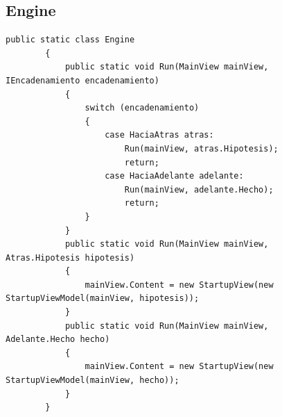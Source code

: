 \documentclass[conference]{IEEEtran}
\begin{document}
\newpage
\begin{figure}[t]
    \subsection{Engine}
    \begin{lstlisting}[language={[Sharp]C}, title={Engine}]
        public static class Engine
        {
            public static void Run(MainView mainView, IEncadenamiento encadenamiento)
            {
                switch (encadenamiento)
                {
                    case HaciaAtras atras:
                        Run(mainView, atras.Hipotesis);
                        return;
                    case HaciaAdelante adelante:
                        Run(mainView, adelante.Hecho);
                        return;
                }
            }
            public static void Run(MainView mainView, Atras.Hipotesis hipotesis)
            {
                mainView.Content = new StartupView(new StartupViewModel(mainView, hipotesis));
            }
            public static void Run(MainView mainView, Adelante.Hecho hecho)
            {
                mainView.Content = new StartupView(new StartupViewModel(mainView, hecho));
            }
        }
\end{lstlisting}
\end{figure}
\newpage 
\end{document}

